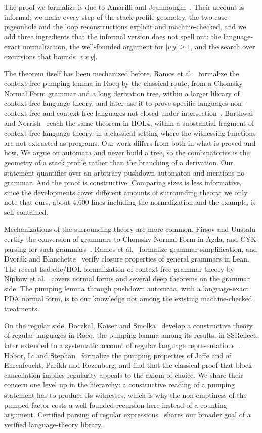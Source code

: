 \documentclass[runningheads]{llncs}
\begin{document}
The proof we formalize is due to Amarilli and Jeanmougin~\cite{Amarilli12}.
Their account is informal; we make every step of the stack-profile geometry, the
two-case pigeonhole and the loop reconstructions explicit and machine-checked, and
we add three ingredients that the informal version does not spell out: the
language-exact normalization, the well-founded argument for $|v\,y| \geq 1$, and
the search over excursions that bounds $|v\,x\,y|$.

The theorem itself has been mechanized before. Ramos et
al.~\cite{RamosPumping16} formalize the context-free pumping lemma in Rocq by the
classical route, from a Chomsky Normal Form grammar and a long derivation tree,
within a larger library of context-free language theory, and later use it to
prove specific languages non-context-free and context-free languages not closed
under intersection~\cite{RamosApplications19}. Barthwal and
Norrish~\cite{Barthwal10,Barthwal10thesis} reach the same theorem in HOL4,
within a substantial fragment of context-free language theory, in a classical
setting where the witnessing functions are not extracted as programs. Our work
differs from both in what is proved and how. We argue on automata and never build
a tree, so the combinatorics is the geometry of a stack profile rather than the
branching of a derivation. Our statement quantifies over an arbitrary pushdown
automaton and mentions no grammar. And the proof is constructive. Comparing sizes
is less informative, since the developments cover different amounts of
surrounding theory; we only note that ours, about 4,600 lines including the
normalization and the example, is self-contained.

Mechanizations of the surrounding theory are more common. Firsov and
Uustalu~\cite{Firsov15} certify the conversion of grammars to Chomsky Normal Form
in Agda, and CYK parsing for such grammars~\cite{Firsov14}. Ramos et
al.~\cite{Ramos15} formalize grammar simplification, and
Dvo\v{r}\'{a}k and Blanchette~\cite{Dvorak23} verify closure properties of
general grammars in Lean. The recent Isabelle/HOL formalization of context-free
grammar theory by Nipkow et al.~\cite{NipkowLRY-IJCAR26} covers normal forms and
several deep theorems on the grammar side. The pumping lemma through pushdown
automata, with a language-exact PDA normal form, is to our knowledge not among
the existing machine-checked treatments.

On the regular side, Doczkal, Kaiser and Smolka~\cite{Doczkal13} develop a
constructive theory of regular languages in Rocq, the pumping lemma among its
results, in SSReflect, later extended to a systematic account of regular language
representations~\cite{DoczkalSmolka18}. Hobor, Li and Stephan~\cite{Hobor19}
formalize the pumping properties of Jaffe and of Ehrenfeucht, Parikh and
Rozenberg, and find that the classical proof that block cancellation implies
regularity appeals to the axiom of choice. We share their concern one level up in
the hierarchy: a constructive reading of a pumping statement has to produce its
witnesses, which is why the non-emptiness of the pumped factor costs a
well-founded recursion here instead of a counting argument. Certified parsing of
regular expressions~\cite{Lopes16,Cardoso23} shares our broader goal of a
verified language-theory library.
\end{document}
